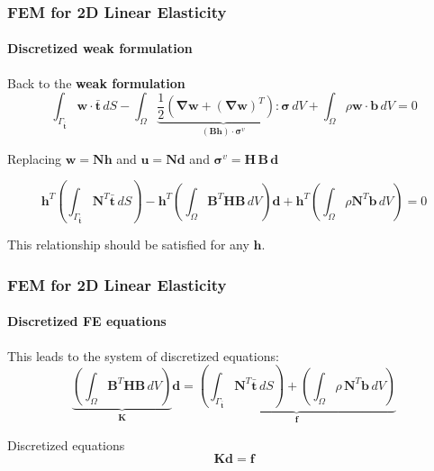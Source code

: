 \documentclass[10pt,xcolor=pdftex,dvipsnames,table]{beamer}
\begin{document}
\begin{frame}
	\frametitle{ FEM for 2D Linear Elasticity }
	\framesubtitle{ Discretized weak formulation }
	
	Back to the \textbf{weak formulation}
	\begin{equation*}
		\int_{\Gamma_{\bar{\boldsymbol{t}}}} \boldsymbol{w}\cdot \boldsymbol{\bar{t}}\, dS
		- \int_{\Omega} 
		\underbrace{\frac{1}{2} \left( \boldsymbol{\nabla}\boldsymbol{w} + (\boldsymbol{\nabla}\boldsymbol{w})^T \right) 
		: \boldsymbol{\sigma}}_{(\mathbf{B}\boldsymbol{h})\cdot\boldsymbol{\sigma}^v }\, dV		
		+ \int_{\Omega} \rho \boldsymbol{w} \cdot \boldsymbol{b}\, dV = 0
	\end{equation*}	
	
	
	
	Replacing $\boldsymbol{w}=\mathbf{N}\boldsymbol{h}$ and $\boldsymbol{u}=\mathbf{N}\boldsymbol{d}$ and $\boldsymbol{\sigma}^v = \mathbf{H}\,\mathbf{B}\,\boldsymbol{d}$	
	
	
	\begin{equation*}
			\boldsymbol{h}^T \left( \int_{\Gamma_{\bar{\boldsymbol{t}}}} \mathbf{N}^T\boldsymbol{\bar{t}}\, dS \right)  - \boldsymbol{h}^T \left(\int_{\Omega}\mathbf{B}^T\mathbf{H}\mathbf{B} \, dV \right) \boldsymbol{d}
			+ \boldsymbol{h}^T \left( \int_{\Omega} \rho\mathbf{N}^T\boldsymbol{b}\, dV \right) = 0
	\end{equation*}		
	
	This relationship should be satisfied for any $\boldsymbol{h}$.
	
\end{frame}




\begin{frame}
	\frametitle{ FEM for 2D Linear Elasticity }
	\framesubtitle{ Discretized FE equations }
	
	This leads to the system of discretized equations:
	\begin{equation*}
		\underbrace{\left(\int_{\Omega}\mathbf{B}^T\mathbf{H}\mathbf{B} \, dV \right)}_{\mathbf{K}} \boldsymbol{d}		
		= 
		\underbrace{\left( \int_{\Gamma_{\bar{\boldsymbol{t}}}} \mathbf{N}^T\boldsymbol{\bar{t}}\, dS \right)
		+  \left( \int_{\Omega} \rho\,\mathbf{N}^T\boldsymbol{b}\, dV \right)}_{\boldsymbol{f}}
	\end{equation*}		
	
		
	\begin{block}{Discretized equations}	
		\begin{equation*}
			\mathbf{K}\boldsymbol{d}=\boldsymbol{f}
		\end{equation*}	
	\end{block}


\end{frame}
\end{document}
